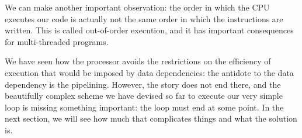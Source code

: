 We can make another important observation: the order in which the CPU executes our code is actually not the same order in which the instructions are written. This is called out-of-order execution, and it has important consequences for multi-threaded programs.

We have seen how the processor avoids the restrictions on the efficiency of execution that would be imposed by data dependencies: the antidote to the data dependency is the pipelining. However, the story does not end there, and the beautifully complex scheme we have devised so far to execute our very simple loop is missing something important: the loop must end at some point. In the next section, we will see how much that complicates things and what the solution is.























